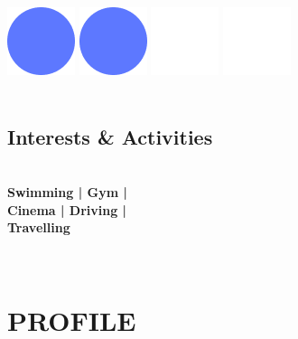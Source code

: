 \documentclass[]{friggeri-cv_reccius-experiment}
\begin{document}
\begin{below1}
    \includegraphics[scale=0.11]{img/IPSDots.png}
    \includegraphics[scale=0.11]{img/IPSDots.png}
    \includegraphics[scale=0.11]{img/WhiteDots.png}
    \includegraphics[scale=0.11]{img/WhiteDots.png}\\
    \belowspace~  
\end{below1}

\begin{below2}
  \section{Interests \& Activities}
    \\\vspace{1.7mm}
    \textbf{Swimming | Gym |\\
    \belowspace 
    Cinema | Driving | \\
    \belowspace
    Travelling}\\
    \belowspace
    
~
\end{below2}
\newcommand{\eduspace}{\vspace*{0.85mm}}
\newcommand{\eduspaceII}{\vspace*{0.8mm}}
\newcommand{\jobspace}{\vspace*{-4.2mm}}
\vspace{-0.5mm}

\section{PROFILE}
\end{document}
